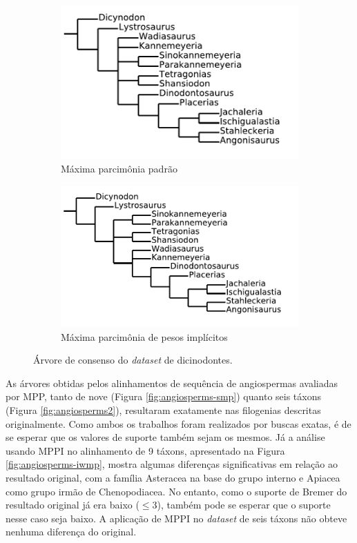 \documentclass[12pt]{article}
\begin{document}
\begin{figure}[ht]
  \centering
  \begin{subfigure}{.4\textwidth}
    \includegraphics[width=\textwidth]{img/dicynodons-smp_svg-tex.pdf}
    \caption{Máxima parcimônia padrão}
    \label{fig:dicynodons-smp}
  \end{subfigure}
  \begin{subfigure}{.4\textwidth}
    \includegraphics[width=\textwidth]{img/dicynodons-iwmp_svg-tex.pdf}
    \caption{Máxima parcimônia de pesos implícitos}
    \label{fig:dicynodons-iwmp}
  \end{subfigure}
  \caption{Árvore de consenso do \emph{dataset} de dicinodontes.}
  \label{fig:dicynodons}
\end{figure}

As árvores obtidas pelos alinhamentos de sequência de angiospermas avaliadas por MPP, tanto de nove (Figura \ref{fig:angiosperms-smp}) quanto seis táxons (Figura \ref{fig:angiosperms2}), resultaram exatamente nas filogenias descritas originalmente. Como ambos os trabalhos foram realizados por buscas exatas, é de se esperar que os valores de suporte também sejam os mesmos. Já a análise usando MPPI no alinhamento de 9 táxons, apresentado na Figura \ref{fig:angiosperms-iwmp}, mostra algumas diferenças significativas em relação ao resultado original, com a família Asteracea na base do grupo interno e Apiacea como grupo irmão de Chenopodiacea. No entanto, como o suporte de Bremer do resultado original já era baixo ($\leq 3$), também pode se esperar que o suporte nesse caso seja baixo. A aplicação de MPPI no \emph{dataset} de seis táxons não obteve nenhuma diferença do original.
\end{document}
